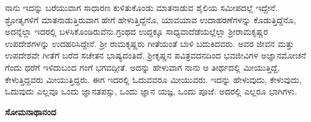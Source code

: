 ನಾನು ಇದನ್ನು ಬರೆಯುವಾಗ ಸಾಧಾರಣ ಕುಳಿತುಕೊಂಡು ಮಾತನಾಡುವ ಶೈಲಿಯ ಸಮೀಪದಲ್ಲೆ ಇದ್ದೇನೆ. ಶ್ರೋತೃಗಳಿಗೆ ಮಾತನಾಡುತ್ತಿರುವಾಗ ಹೇಗೆ ಹೇಳುತ್ತಿದ್ದೆನೊ, ಯಾವ\-ಯಾವ ಉದಾಹರಣೆಗಳನ್ನು ಕೊಡುತ್ತಿದ್ದೆನೊ, ಅದನ್ನೆಲ್ಲಾ ಇದರಲ್ಲಿ ಬಳಸಿಕೊಂಡಿರುವೆನು.\break ಗ್ರಂಥದ ಉದ್ದಕ್ಕೂ ಸಾಧ್ಯವಾದೆಡೆಯಲ್ಲೆಲ್ಲಾ ಶ‍್ರೀರಾಮಕೃಷ್ಣರ ಉಪದೇಶಗಳನ್ನು ಉದಹರಿಸಿದ್ದೇನೆ. ಶ‍್ರೀ ರಾಮಕೃಷ್ಣರು ಗೀತೆಯಂತೆ ಬಾಳಿ ಬದುಕಿದವರು. ಅವರ ಜೀವನ ಮತ್ತು ಉಪದೇಶವೇ ಗೀತೆಗೆ ಬರೆದ ಸಚೇತನ ಭಾಷ್ಯದಂತಿದೆ. ಶ‍್ರೀಕೃಷ್ಣನ ಪವಿತ್ರವದನದಿಂದ ಭವಜೀವಿಗಳ ಅಜ್ಞಾನಮೋಚನೆ ಗೆಂದು ಧರೆಗೆ ಇಳಿದುಬಂದ ಗಂಗೆ ಭಗವದ್ಗೀತೆ. ಅದನ್ನು ಹೇಳುವಾಗ ನಾನು ಆ ತೀರ್ಥದಲ್ಲಿ ಮೀಯುತ್ತಿದ್ದೆ, ಕೇಳುತ್ತಿದ್ದವರು ಮೀಯುತ್ತಿದ್ದರು. ಈಗ ಇದರಲ್ಲಿ ಓದುವವರೂ ಮೀಯುವರು. ಇದನ್ನು ಹೇಳುವುದು, ಕೇಳುವುದು, ಓದುವುದು ಎಲ್ಲವೂ ಒಂದು ಜ್ಞಾನತಪಸ್ಸು, ಒಂದು ಜ್ಞಾನ ಯಜ್ಞ, ಒಂದು ಪೂಜೆ. ಅದರಲ್ಲಿ ಎಲ್ಲರೂ ಭಾಗಿಗಳು.

\bigskip

\begin{flushright}
\textbf{ಸೋಮನಾಥಾನಂದ}
\end{flushright}

